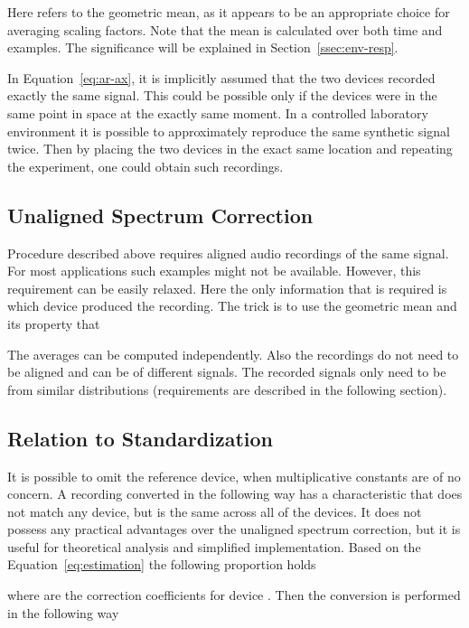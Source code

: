 \documentclass[a4paper]{article}
\begin{document}
Here  refers to the geometric mean, as it appears to be an appropriate choice for averaging scaling factors.
Note that the mean is calculated over both time and examples. 
The significance will be explained in Section~\ref{ssec:env-resp}.


In Equation~\eqref{eq:ar-ax}, it is implicitly assumed that the two devices recorded exactly the same signal. This could be possible only if the devices were in the same point in space at the exactly same moment. In a controlled laboratory environment it is possible to approximately reproduce the same synthetic signal twice. Then by placing the two devices in the exact same location and repeating the experiment, one could obtain such recordings. 


\subsection{Unaligned Spectrum Correction}
\label{ssec:unaligned-spectrum-correction}

Procedure described above requires aligned audio recordings of the same signal. For most applications such examples might not be available. However, this requirement can be easily relaxed. Here the only information that is required is which device produced the recording. 
The trick is to use the geometric mean and its property that

The averages can be computed independently. Also the recordings do not need to be aligned and can be of different signals. The recorded signals only need to be from similar distributions (requirements are described in the following section).


\subsection{Relation to Standardization}
\label{ssec:simplifications}

It is possible to omit the reference device, when multiplicative constants are of no concern. A recording converted in the following way has a characteristic that does not match any device, but is the same across all of the devices. It does not possess any practical advantages over the unaligned spectrum correction, but it is useful for theoretical analysis and simplified implementation.
Based on the Equation~\eqref{eq:estimation} the following proportion holds

where  are the correction coefficients for device .
Then the conversion is performed in the following way
\end{document}
